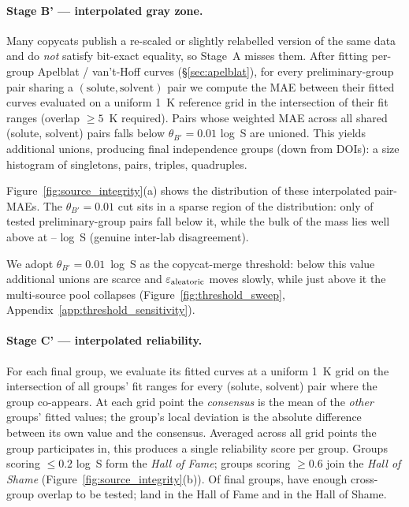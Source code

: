 \paragraph{Stage B' — interpolated gray zone.}
Many copycats publish a re-scaled or slightly relabelled version of the
same data and do \emph{not} satisfy bit-exact equality, so Stage~A
misses them.  After fitting per-group Apelblat / van't-Hoff curves
(§\ref{sec:apelblat}), for every preliminary-group pair sharing a
$(\mathrm{solute},\mathrm{solvent})$ pair we compute the MAE between
their fitted curves evaluated on a uniform 1~K reference grid in the
intersection of their fit ranges (overlap $\geq 5$~K required).  Pairs
whose weighted MAE across all shared (solute, solvent) pairs falls below
$\theta_{B'} = 0.01$ log~S are unioned.  This yields 
additional unions, producing  final independence groups
(down from  DOIs): a size histogram of 
singletons,  pairs,  triples, 
quadruples.

Figure~\ref{fig:source_integrity}(a) shows the distribution of these
interpolated pair-MAEs.  The $\theta_{B'} = 0.01$ cut sits in a sparse
region of the distribution: only  of  tested
preliminary-group pairs fall below it, while the bulk of the mass lies
well above at -- log~S (genuine inter-lab
disagreement).

We adopt $\theta_{B'} = 0.01$~log~S as the copycat-merge threshold: below this value additional unions are scarce and $\varepsilon_{\text{aleatoric}}$ moves slowly, while just above it the multi-source pool collapses (Figure~\ref{fig:threshold_sweep}, Appendix~\ref{app:threshold_sensitivity}).

\paragraph{Stage C' — interpolated reliability.}
For each final group, we evaluate its fitted curves at a uniform 1~K
grid on the intersection of all groups' fit ranges for every
(solute, solvent) pair where the group co-appears.  At each grid point
the \emph{consensus} is the mean of the \emph{other} groups' fitted
values; the group's local deviation is the absolute difference between
its own value and the consensus.  Averaged across all grid points the
group participates in, this produces a single reliability score per
group.  Groups scoring $\leq 0.2$ log~S form the \emph{Hall of Fame};
groups scoring $\geq 0.6$ join the \emph{Hall of Shame}
(Figure~\ref{fig:source_integrity}(b)).  Of  final
groups,  have enough cross-group overlap to be tested;
 land in the Hall of Fame and  in the Hall of
Shame.


